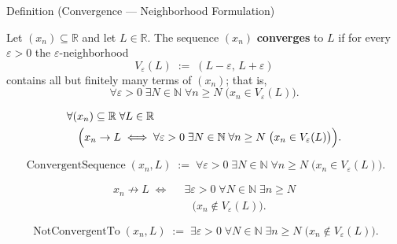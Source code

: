 \begin{definitionbox}{Definition (Convergence --- Neighborhood Formulation)}
\begin{definition}
\label{def:convergent-sequence-neighborhood}

Let $(x_n) \subseteq \mathbb{R}$ and let $L \in \mathbb{R}$. The sequence
$(x_n)$ \textbf{converges} to $L$ if for every $\varepsilon > 0$ the
$\varepsilon$-neighborhood
\[
    V_\varepsilon(L) \;:=\; (L - \varepsilon,\, L + \varepsilon)
\]
contains all but finitely many terms of $(x_n)$; that is,
\[
    \forall \varepsilon > 0 \;\exists N \in \mathbb{N} \;\forall n \ge N
    \;\bigl(x_n \in V_\varepsilon(L)\bigr).
\]
\end{definition}
\end{definitionbox}

\begin{remark*}
\[
\begin{aligned}
&\forall (x_n) \subseteq \mathbb{R} \;\forall L \in \mathbb{R}\\
&\quad\Bigl(
    x_n \to L
    \;\Longleftrightarrow\;
    \forall \varepsilon > 0 \;\exists N \in \mathbb{N} \;\forall n \ge N
    \;\bigl(x_n \in V_\varepsilon(L)\bigr)
\Bigr).
\end{aligned}
\]
\end{remark*}

\begin{remark*}
\[
\operatorname{ConvergentSequence}(x_n, L)
\;:=\;
\forall \varepsilon > 0 \;\exists N \in \mathbb{N} \;\forall n \ge N
\;\bigl(x_n \in V_\varepsilon(L)\bigr).
\]
\end{remark*}

\begin{remark*}
\[
\begin{aligned}
x_n \not\to L
\;\Longleftrightarrow\;
&\;\exists \varepsilon > 0 \;\forall N \in \mathbb{N} \;\exists n \ge N\\
&\quad\bigl(x_n \notin V_\varepsilon(L)\bigr).
\end{aligned}
\]
\end{remark*}

\begin{remark*}
\[
\operatorname{NotConvergentTo}(x_n,L)
\;:=\;
\exists \varepsilon > 0 \;\forall N \in \mathbb{N} \;\exists n \ge N
\;\bigl(x_n \notin V_\varepsilon(L)\bigr).
\]
\end{remark*}

